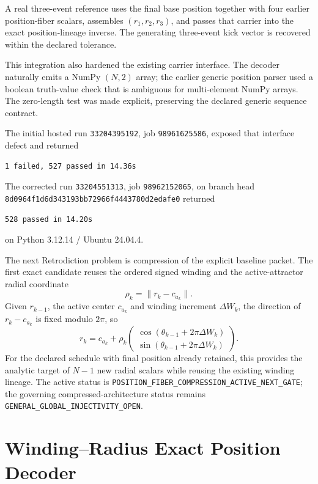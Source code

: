 \documentclass[11pt]{book}
\begin{document}
A real three-event reference uses the final base position together with four earlier position-fiber scalars, assembles $(r_1,r_2,r_3)$, and passes that carrier into the exact position-lineage inverse. The generating three-event kick vector is recovered within the declared tolerance.

This integration also hardened the existing carrier interface. The decoder naturally emits a NumPy $(N,2)$ array; the earlier generic position parser used a boolean truth-value check that is ambiguous for multi-element NumPy arrays. The zero-length test was made explicit, preserving the declared generic sequence contract.

The initial hosted run \texttt{33204395192}, job \texttt{98961625586}, exposed that interface defect and returned
\begin{verbatim}
1 failed, 527 passed in 14.36s
\end{verbatim}
The corrected run \texttt{33204551313}, job \texttt{98962152065}, on branch head \texttt{8d0964f1d6d343193bb72966f4443780d2edafe0} returned
\begin{verbatim}
528 passed in 14.20s
\end{verbatim}
on Python 3.12.14 / Ubuntu 24.04.4.

The next Retrodiction problem is compression of the explicit baseline packet. The first exact candidate reuses the ordered signed winding and the active-attractor radial coordinate
\[
\rho_k=\|r_k-c_{a_k}\|.
\]
Given $r_{k-1}$, the active center $c_{a_k}$ and winding increment $\Delta W_k$, the direction of $r_k-c_{a_k}$ is fixed modulo $2\pi$, so
\[
\boxed{
r_k=c_{a_k}+\rho_k
\begin{pmatrix}
\cos(\theta_{k-1}+2\pi\Delta W_k)\\
\sin(\theta_{k-1}+2\pi\Delta W_k)
\end{pmatrix}.
}
\]
For the declared schedule with final position already retained, this provides the analytic target of $N-1$ new radial scalars while reusing the existing winding lineage. The active status is \texttt{POSITION\_FIBER\_COMPRESSION\_ACTIVE\_NEXT\_GATE}; the governing compressed-architecture status remains \texttt{GENERAL\_GLOBAL\_INJECTIVITY\_OPEN}.

\chapter{Winding--Radius Exact Position Decoder}
\label{chap:winding-radius-position-decoder}
\end{document}
